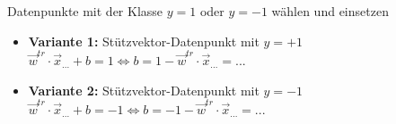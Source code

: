 \begin{enumerate}
        Datenpunkte mit der Klasse $y = 1$ oder $y = -1$ wählen und einsetzen
        \begin{itemize}
            \item \textbf{Variante 1:} Stützvektor-Datenpunkt mit $y = +1$\\
                $\boxed{\vec{w}^{tr}\cdot\vec{x}_{...} + b = 1} \Leftrightarrow  \boxed{b = 1 -\vec{w}^{tr}\cdot\vec{x}_{...} = ...}$
            \item \textbf{Variante 2:} Stützvektor-Datenpunkt mit $y = -1$\\
                $\boxed{\vec{w}^{tr}\cdot\vec{x}_{...} + b = -1} \Leftrightarrow  \boxed{b = -1 -\vec{w}^{tr}\cdot\vec{x}_{...} = ...}$
        \end{itemize}
\end{enumerate}
